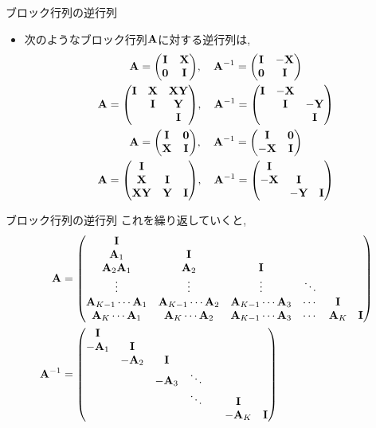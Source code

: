\documentclass[dvipdfmx,notheorems,t]{beamer}
\begin{document}
\begin{frame}{ブロック行列の逆行列}
\begin{itemize}
  \item 次のようなブロック行列$\vb{A}$に対する逆行列は,
  \begin{gather*}
    \vb{A} = \mqty(\vb{I} & \vb{X} \\ \vb{0} & \vb{I}), \quad
      \vb{A}^{-1} = \mqty(\vb{I} & -\vb{X} \\ \vb{0} & \vb{I}) \\
    \vb{A} = \mqty(\vb{I} & \vb{X} & \vb{X} \vb{Y} \\ & \vb{I} & \vb{Y} \\ & & \vb{I}), \quad
      \vb{A}^{-1} = \mqty(\vb{I} & -\vb{X} \\ & \vb{I} & -\vb{Y} \\ & & \vb{I}) \\
    \vb{A} = \mqty(\vb{I} & \vb{0} \\ \vb{X} & \vb{I}), \quad
      \vb{A}^{-1} = \mqty(\vb{I} & \vb{0} \\ -\vb{X} & \vb{I}) \\
    \vb{A} = \mqty(\vb{I} \\ \vb{X} & \vb{I} \\ \vb{X} \vb{Y} & \vb{Y} & \vb{I}), \quad
      \vb{A}^{-1} = \mqty(\vb{I} \\ -\vb{X} & \vb{I} \\ & -\vb{Y} & \vb{I})
  \end{gather*}
\end{itemize}
\end{frame}

\begin{frame}{ブロック行列の逆行列}
これを繰り返していくと,
\begin{align*}
  \vb{A} &= \mqty(\vb{I} \\
    \vb{A}_1 & \vb{I} \\
    \vb{A}_2 \vb{A}_1 & \vb{A}_2 & \vb{I} \\
    \vdots & \vdots & \vdots & \ddots \\
    \vb{A}_{K - 1} \cdots \vb{A}_1 & \vb{A}_{K - 1} \cdots \vb{A}_2 &
      \vb{A}_{K - 1} \cdots \vb{A}_3 & \cdots & \vb{I} \\
    \vb{A}_K \cdots \vb{A}_1 & \vb{A}_K \cdots \vb{A}_2 &
      \vb{A}_{K - 1} \cdots \vb{A}_3 & \cdots & \vb{A}_K & \vb{I}) \\
  \vb{A}^{-1} &= \mqty(\vb{I} \\
    -\vb{A}_1 & \vb{I} \\
    & -\vb{A}_2 & \vb{I} \\
    & & -\vb{A}_3 & \ddots \\
    & & & \ddots & & \vb{I} \\
    & & & & & -\vb{A}_K & \vb{I})
\end{align*}
\end{frame}
\end{document}
